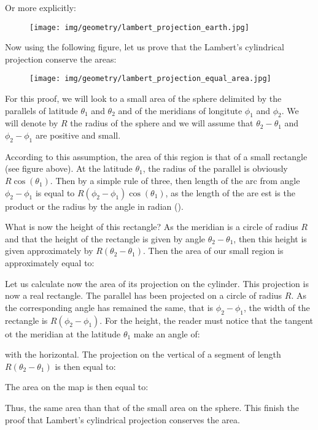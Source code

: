 	Or more explicitly:
	\begin{figure}[H]
		\centering
		\texttt{[image: img/geometry/lambert\_projection\_earth.jpg]}
	\end{figure}
	Now using the following figure, let us prove that the Lambert's cylindrical projection conserve the areas:
	\begin{figure}[H]
		\centering
		\texttt{[image: img/geometry/lambert\_projection\_equal\_area.jpg]}
	\end{figure}
	For this proof, we will look to a small area of the sphere delimited by the parallels of latitude $\theta_1$ and $\theta_2$ and of the meridians of longitute $\phi_1$ and $\phi_2$. We will denote by $R$ the radius of the sphere and we will assume that $\theta_2-\theta_1$ and $\phi_2-\phi_1$ are positive and small.

	According to this assumption, the area of this region is that of a small rectangle (see figure above). At the latitude $\theta_1$, the radius of the parallel is obviously $R\cos(\theta_1)$. Then by a simple rule of three, then length of the arc from angle $\phi_2-\phi_1$ is equal to $R(\phi_2-\phi_1)\cos(\theta_1)$, as the length of the are est is the product or the radius by the angle in radian ().
	
	What is now the height of this rectangle? As the meridian is a circle of radius $R$ and that the height of the rectangle is given by angle $\theta_2-\theta_1$, then this height is given approximately by $R(\theta_2-\theta_1)$. Then the area of our small region is approximately equal to:
	
	Let us calculate now the area of its projection on the cylinder. This projection is now a real rectangle. The parallel has been projected on a circle of radius $R$. As the corresponding angle has remained the same, that is $\phi_2-\phi_1$, the width of the rectangle is $R(\phi_2-\phi_1)$. For the height, the reader must notice that the tangent ot the meridian at the latitude $\theta_1$ make an angle of:
	
	with the horizontal. The projection on the vertical of a segment of length $R(\theta_2-\theta_1)$ is then equal to:
	
	The area on the map is then equal to:
	
	Thus, the same area than that of the small area on the sphere. This finish the proof that Lambert's cylindrical projection conserves the area.
	
